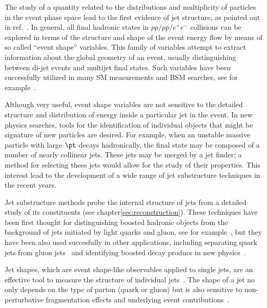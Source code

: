 The study of a quantity related to the distributions and multiplicity of particles in the event phase space lead to the first evidence of jet structure, as pointed out in ref.~\cite{PhysRevLett.35.1609}. In general, all final hadronic states in $pp/p\bar{p}/e^+e^-$ collisions can be explored in terms of the structure and shape of the event energy flow by means of so called ``event shape'' variables. This family of variables attempt to extract information about the global geometry of an event, usually distinguishing between di-jet events and multijet final states. Such variables have been successfully utilized in many SM measurements and BSM searches, see for example~\cite{Abbiendi:2007aa}\cite{Aad:2012np}. 

Although very useful, event shape variables are not sensitive to the detailed structure and distribution of energy inside a particular jet in the event. In new physics searches, tools for the identification of individual objects that might be signature of new particles are desired. For example, when an unstable massive particle with large $\pt$ decays hadronically, the final state may be composed of a number of nearly collinear jets. These jets may be merged by a jet finder; %
a method for selecting these jets would allow for the study of their properties.
  This interest lead to the development of a wide range of jet substructure techniques in the recent years.

  Jet substructure methods probe the internal structure of jets from a detailed study of its constituents (see chapter\ref{sec:reconstruction}). These techniques have been first thought for distinguishing boosted hadronic objects from the background of jets initiated by light quarks and gluon, see for example~\cite{ATLASBoostedHbb},
but they have been also used succesfully in other applications, including separating quark jets from gluon jets~\cite{PhysRevLett.107.172001} and identifying boosted decay producs in new physics~\cite{PhysRevD.82.095012}.

Jet shapes, which are event shape-like observables applied to single jets, are an effective tool to measure the structure of individual jets~\cite{springerlink:10.1007/JHEP11(2010)101}.%
 The shape of a jet no only depends on the type of parton (quark or gluon) but is also sensitive to non-perturbative fragmentation effects and underlying event contributions~\cite{ATLASJetShapes}.



